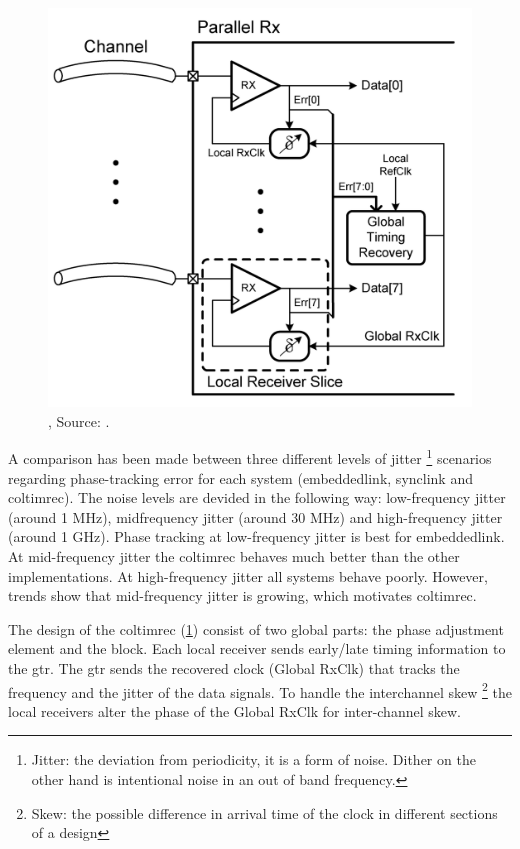 \begin{figure}[]
	\centering
	\includegraphics[width=0.85\linewidth]{Figures/Rep1CombLink.png}
	\caption{, Source: \cite{agrawal20098}.} 
    \label{fig:rep1:coltimrec}
\end{figure}

A comparison has been made between three different levels of jitter \footnote{Jitter: the deviation from periodicity, it is a form of noise. Dither on the other hand is intentional noise in an out of band frequency.} scenarios regarding phase-tracking error for each system (\ac{embeddedlink}, \ac{synclink} and \ac{coltimrec}). 
The noise levels are devided in the following way: low-frequency jitter (around 1 MHz), midfrequency jitter (around 30 MHz) and high-frequency jitter (around 1 GHz).
Phase tracking at low-frequency jitter is best for \ac{embeddedlink}. 
At mid-frequency jitter the \ac{coltimrec} behaves much better than the other implementations. 
At high-frequency jitter all systems behave poorly.
However, trends show that mid-frequency jitter is growing, which motivates \ac{coltimrec}.

The design of the \ac{coltimrec} (\cref{fig:rep1:coltimrec}) consist of two global parts: the phase adjustment element and the  block.
Each local receiver sends early/late timing information to the \ac{gtr}.
The \ac{gtr} sends the recovered clock (Global RxClk) that tracks the frequency and the jitter of the data signals.
To handle the interchannel skew \footnote{Skew: the possible difference in arrival time of the clock in different sections of a design} the local receivers alter the phase of the Global RxClk for inter-channel skew.

